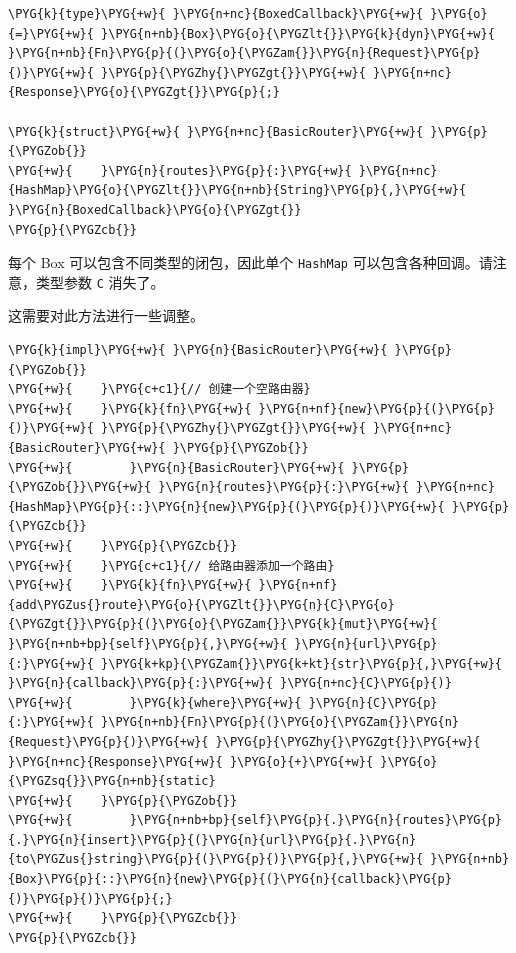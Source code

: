 \begin{Verbatim}[commandchars=\\\{\},breaklines=true,breakanywhere=true,fontsize=\codefont,xleftmargin=17bp]
\PYG{k}{type}\PYG{+w}{ }\PYG{n+nc}{BoxedCallback}\PYG{+w}{ }\PYG{o}{=}\PYG{+w}{ }\PYG{n+nb}{Box}\PYG{o}{\PYGZlt{}}\PYG{k}{dyn}\PYG{+w}{ }\PYG{n+nb}{Fn}\PYG{p}{(}\PYG{o}{\PYGZam{}}\PYG{n}{Request}\PYG{p}{)}\PYG{+w}{ }\PYG{p}{\PYGZhy{}\PYGZgt{}}\PYG{+w}{ }\PYG{n+nc}{Response}\PYG{o}{\PYGZgt{}}\PYG{p}{;}

\PYG{k}{struct}\PYG{+w}{ }\PYG{n+nc}{BasicRouter}\PYG{+w}{ }\PYG{p}{\PYGZob{}}
\PYG{+w}{    }\PYG{n}{routes}\PYG{p}{:}\PYG{+w}{ }\PYG{n+nc}{HashMap}\PYG{o}{\PYGZlt{}}\PYG{n+nb}{String}\PYG{p}{,}\PYG{+w}{ }\PYG{n}{BoxedCallback}\PYG{o}{\PYGZgt{}}
\PYG{p}{\PYGZcb{}}
\end{Verbatim}

每个 Box 可以包含不同类型的闭包，因此单个 \texttt{HashMap} 可以包含各种回调。请注意，类型参数 \texttt{C} 消失了。

这需要对此方法进行一些调整。

\begin{Verbatim}[commandchars=\\\{\},breaklines=true,breakanywhere=true,fontsize=\codefont,xleftmargin=17bp]
\PYG{k}{impl}\PYG{+w}{ }\PYG{n}{BasicRouter}\PYG{+w}{ }\PYG{p}{\PYGZob{}}
\PYG{+w}{    }\PYG{c+c1}{// 创建一个空路由器}
\PYG{+w}{    }\PYG{k}{fn}\PYG{+w}{ }\PYG{n+nf}{new}\PYG{p}{(}\PYG{p}{)}\PYG{+w}{ }\PYG{p}{\PYGZhy{}\PYGZgt{}}\PYG{+w}{ }\PYG{n+nc}{BasicRouter}\PYG{+w}{ }\PYG{p}{\PYGZob{}}
\PYG{+w}{        }\PYG{n}{BasicRouter}\PYG{+w}{ }\PYG{p}{\PYGZob{}}\PYG{+w}{ }\PYG{n}{routes}\PYG{p}{:}\PYG{+w}{ }\PYG{n+nc}{HashMap}\PYG{p}{::}\PYG{n}{new}\PYG{p}{(}\PYG{p}{)}\PYG{+w}{ }\PYG{p}{\PYGZcb{}}
\PYG{+w}{    }\PYG{p}{\PYGZcb{}}
\PYG{+w}{    }\PYG{c+c1}{// 给路由器添加一个路由}
\PYG{+w}{    }\PYG{k}{fn}\PYG{+w}{ }\PYG{n+nf}{add\PYGZus{}route}\PYG{o}{\PYGZlt{}}\PYG{n}{C}\PYG{o}{\PYGZgt{}}\PYG{p}{(}\PYG{o}{\PYGZam{}}\PYG{k}{mut}\PYG{+w}{ }\PYG{n+nb+bp}{self}\PYG{p}{,}\PYG{+w}{ }\PYG{n}{url}\PYG{p}{:}\PYG{+w}{ }\PYG{k+kp}{\PYGZam{}}\PYG{k+kt}{str}\PYG{p}{,}\PYG{+w}{ }\PYG{n}{callback}\PYG{p}{:}\PYG{+w}{ }\PYG{n+nc}{C}\PYG{p}{)}
\PYG{+w}{        }\PYG{k}{where}\PYG{+w}{ }\PYG{n}{C}\PYG{p}{:}\PYG{+w}{ }\PYG{n+nb}{Fn}\PYG{p}{(}\PYG{o}{\PYGZam{}}\PYG{n}{Request}\PYG{p}{)}\PYG{+w}{ }\PYG{p}{\PYGZhy{}\PYGZgt{}}\PYG{+w}{ }\PYG{n+nc}{Response}\PYG{+w}{ }\PYG{o}{+}\PYG{+w}{ }\PYG{o}{\PYGZsq{}}\PYG{n+nb}{static}
\PYG{+w}{    }\PYG{p}{\PYGZob{}}
\PYG{+w}{        }\PYG{n+nb+bp}{self}\PYG{p}{.}\PYG{n}{routes}\PYG{p}{.}\PYG{n}{insert}\PYG{p}{(}\PYG{n}{url}\PYG{p}{.}\PYG{n}{to\PYGZus{}string}\PYG{p}{(}\PYG{p}{)}\PYG{p}{,}\PYG{+w}{ }\PYG{n+nb}{Box}\PYG{p}{::}\PYG{n}{new}\PYG{p}{(}\PYG{n}{callback}\PYG{p}{)}\PYG{p}{)}\PYG{p}{;}
\PYG{+w}{    }\PYG{p}{\PYGZcb{}}
\PYG{p}{\PYGZcb{}}
\end{Verbatim}


